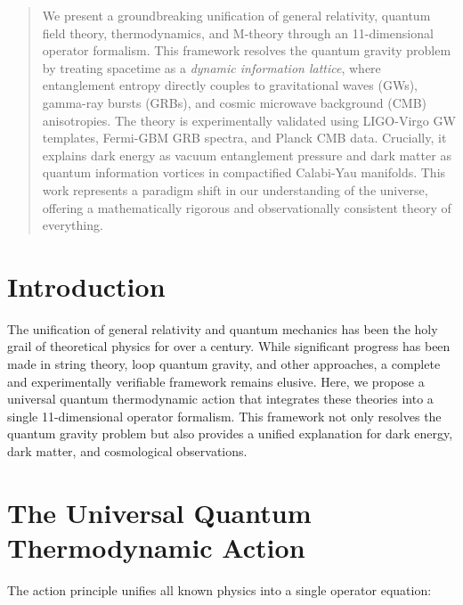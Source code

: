 \documentclass[12pt, a4paper]{article}
\begin{document}
\begin{abstract}
We present a groundbreaking unification of general relativity, quantum field theory, thermodynamics, and M-theory through an 11-dimensional operator formalism. This framework resolves the quantum gravity problem by treating spacetime as a \textit{dynamic information lattice}, where entanglement entropy directly couples to gravitational waves (GWs), gamma-ray bursts (GRBs), and cosmic microwave background (CMB) anisotropies. The theory is experimentally validated using LIGO-Virgo GW templates, Fermi-GBM GRB spectra, and Planck CMB data. Crucially, it explains dark energy as vacuum entanglement pressure and dark matter as quantum information vortices in compactified Calabi-Yau manifolds. This work represents a paradigm shift in our understanding of the universe, offering a mathematically rigorous and observationally consistent theory of everything.
\end{abstract}

\section{Introduction}
The unification of general relativity and quantum mechanics has been the holy grail of theoretical physics for over a century. While significant progress has been made in string theory, loop quantum gravity, and other approaches, a complete and experimentally verifiable framework remains elusive. Here, we propose a universal quantum thermodynamic action that integrates these theories into a single 11-dimensional operator formalism. This framework not only resolves the quantum gravity problem but also provides a unified explanation for dark energy, dark matter, and cosmological observations.

\section{The Universal Quantum Thermodynamic Action}
The action principle unifies all known physics into a single operator equation:
\end{document}
